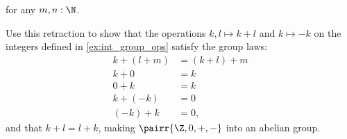\begin{exercises}
\begin{subexenum}
\begin{equation*}
\end{equation*}
for any $m,n:\N$.
\item Use this retraction to show that the operations $k,l\mapsto k+l$ and $k\mapsto -k$ on the integers defined in \autoref{ex:int_group_ops} satisfy the group laws:
\begin{align*}
k+(l+m) & = (k+l)+m \\
k+0 & = k \\
0+k & = k \\
k+(-k) & = 0 \\
(-k) + k & = 0,
\end{align*}
and that $k+l=l+k$, making $\pairr{\Z,0,+,-}$ into an abelian group.
\end{subexenum}
\end{exercises}
